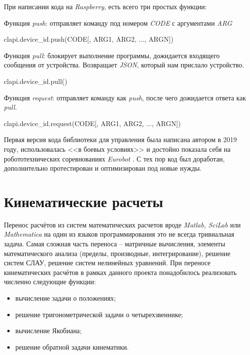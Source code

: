 При написании кода на \textit{Raspberry}, есть всего три простых функции:

\noindent Функция \textit{push}: отправляет команду под номером \textit{CODE} с аргументами \textit{ARG}
\begin{code}
clapi.device_id.push(CODE[, ARG1, ARG2, ..., ARGN])
\end{code}

\noindent Функция \textit{pull}: блокирует выполнение программы, дожидается входящего сообщения от устройства. Возвращает \textit{JSON}, который нам прислало устройство.
\begin{code}
clapi.device_id.pull()
\end{code}

\noindent Функция \textit{request}: отправляет команду как \textit{push}, после чего дожидается ответа как \textit{pull}.
\begin{code}
clapi.device_id.request(CODE[, ARG1, ARG2, ..., ARGN])
\end{code}

Первая версия кода библиотеки для управления была написана автором в 2019 году, использовалась <<в боевых условиях>> и достойно показала себя на робототехнических соревнованиях \textit{Eurobot} \cite{Kekmech2020}. С тех пор код был доработан, дополнительно протестирован и оптимизирован под новые нужды.

\section{Кинематические расчеты}

Перенос расчётов из систем математических расчетов вроде \textit{Matlab, SciLab} или \textit{Mathematica} на один из языков программирования это не всегда тривиальная задача. Самая сложная часть переноса -- матричные вычисления, элементы математического анализа (пределы, производные, интегрирование), решение систем СЛАУ, решение систем нелинейных уравнений. При переносе кинематических расчётов в рамках данного проекта понадобилось реализовать численно следующие функции:
\begin{itemize}
    \item вычисление задачи о положениях;
    \item решение тригонометрической задачи о четырехзвеннике;
    \item вычисление Якобиана;
    \item решение обратной задачи кинематики.
\end{itemize}

